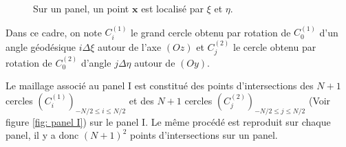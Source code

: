 \begin{figure}[htbp]
\begin{center}
\end{center}
\caption{Sur un panel, un point $\mathbf{x}$ est localisé par $\xi$ et $\eta$.}
\label{fig: panel I xi eta}
\end{figure}


Dans ce cadre, on note $C^{(1)}_i$ le grand cercle obtenu par rotation de $C^{(1)}_0$ d'un angle géodésique $i \Delta \xi$ autour de l'axe $(Oz)$ et $C^{(2)}_j$ le cercle obtenu par rotation de $C^{(2)}_0$ d'angle $j \Delta \eta$ autour de $(Oy)$.

Le maillage associé au panel I est constitué des points d'intersections des $N+1$ cercles $( C_i^{(1)} )_{-N/2 \leq i \leq N/2}$ et des $N+1$ cercles $(C_j^{(2)})_{-N/2 \leq j \leq N/2}$ (Voir figure \ref{fig: panel I}) sur le panel I. Le même procédé est reproduit sur chaque panel, il y a donc $(N+1)^2$ points d'intersections sur un panel.

